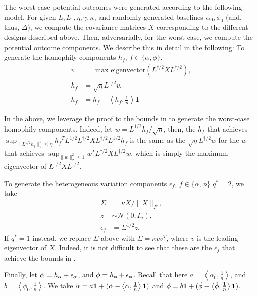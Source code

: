 \documentclass[12pt]{article}
\theoremstyle{definition}
\numberwithin{equation}{section}
\numberwithin{figure}{section}
\newcommand\dotp[1]{\left\langle #1 \right\rangle}
\newcommand{\calN}{{\mathcal N}}
\numberwithin{equation}{section}
\numberwithin{figure}{section}
\begin{document}
The worst-case potential outcomes were generated according to the following model. For given $L, L^\dagger, \eta, \gamma, \kappa$, and randomly generated baselines $\alpha_0, \phi_0$ (and, thus, $\Delta$), we compute the covariance matrices $X$ corresponding to the different designs described above. Then, adversarially, for the worst-case, we compute the potential outcome components. We describe this in detail in the following:
To generate the homophily components $h_f$, $f \in \{\alpha, \phi\}$,
\begin{align*}
    v &= \text{ max eigenvector}(L^{\dagger/2} X L^{\dagger/2}), \\
    h_f &=  \sqrt{\eta}L^{\dagger/2} v, \\
    h_f &=  h_f - \dotp{h_f, \frac{\mathbf{1}}{n}} \mathbf{1}
\end{align*}

In the above, we leverage the proof to the bounds in  to generate the worst-case homophily components. Indeed, let $w = L^{1/2} h_f/ \sqrt{\eta}$, then, the $h_f$ that achieves $\sup_{\|L^{1/2} h_f\|_2^2 \leq \eta} {h_f}^T L^{1/2} L^{\dagger/2} X L^{\dagger/2} L^{1/2} {h_f}$ is the same as the $\sqrt{\eta}L^{\dagger/2}w$ for the $w$ that achieves $\sup_{\|w\|_2^2 \leq 1} w^T L^{\dagger/2} X L^{\dagger/2} w$, which is simply the maximum eigenvector of $L^{\dagger/2} X L^{\dagger/2}$.

To generate the heterogeneous variation components $\epsilon_f$, $f \in \{\alpha, \phi \}$ $q^*=2$, we take
\begin{align*}
    \Sigma &= \kappa X/\|X\|_F, \\
    z &\sim \calN(0, I_n), \\
    \epsilon_f &= \Sigma^{1/2} z.
\end{align*}
If $q^* = 1$ instead, we replace $\Sigma$ above with $\Sigma = \kappa vv^T$, where $v$ is the leading eigenvector of $X$. Indeed, it is not difficult to see that these are the $\epsilon_f$ that achieve the bounds in . 

Finally, let $\Tilde{\alpha} = h_\alpha + \epsilon_\alpha$, and $\Tilde{\phi} = h_\phi + \epsilon_\phi$. Recall that here $a = \dotp{ \alpha_0, \frac{\mathbf{1}}{n}}$, and $b = \dotp{ \phi_0, \frac{\mathbf{1}}{n}}.$ We take $\alpha = a \mathbf{1} + (\Tilde{\alpha} - \dotp{\Tilde{\alpha}, \frac{\mathbf{1}}{n}} \mathbf{1})$ and $\phi = b \mathbf{1} + (\Tilde{\phi} - \dotp{\Tilde{\phi}, \frac{\mathbf{1}}{n}} \mathbf{1}).$
\end{document}
